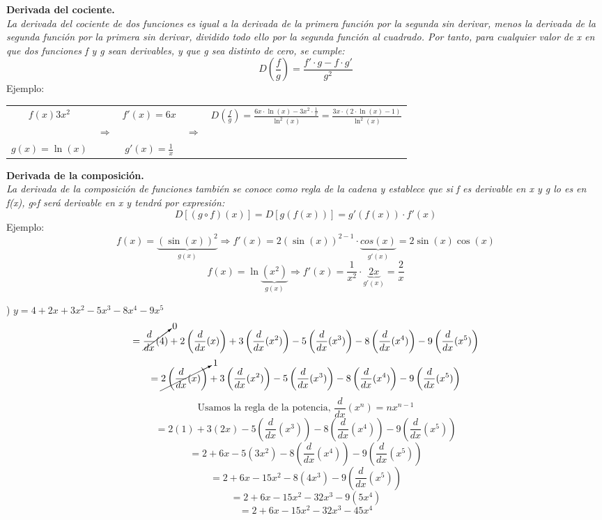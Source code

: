 \documentclass[11pt]{report}
\newcommand{\dx}{\frac{d}{dx}}
\begin{document}
\textbf{Derivada del cociente.}\\[2mm]
\textit{La derivada del cociente de dos funciones es igual a la derivada de la primera función por la segunda sin derivar, menos la derivada de la segunda función por la primera sin derivar, dividido todo ello por la segunda función al cuadrado. Por tanto, para cualquier valor de x en que dos funciones f y g sean derivables, y que g sea distinto de cero, se cumple:}
$$D\left(\frac{f}{g}\right)=\frac{f'\cdot g-f\cdot g'}{g^2}$$
Ejemplo:
\begin{center}
\begin{table}[h]
\begin{tabular}{ccccc}
$f(x)3x^2$ & &$f'(x)=6x$& & \multirow{3}{*}{$D\left(\frac{f}{g}\right)=\frac{6x\cdot \ln(x)-3x^2\cdot \frac{1}{x}}{\ln^2(x)}=\frac{3x\cdot (2\cdot \ln(x)-1)}{\ln^2(x)}$}\\
 &$\Longrightarrow$ & & $\Longrightarrow$ &  \\
$g(x)=\ln(x)$ & &$g'(x)=\frac{1}{x}$& & \\
\end{tabular}
\end{table}
\end{center}

\textbf{Derivada de la composición.}\\[2mm]
\textit{La derivada de la composición de funciones también se conoce como regla de la cadena y establece que si f es derivable en x y g lo es en f(x), g$\circ$f será derivable en x y tendrá por expresión:}
$$D[(g \circ f)(x)]=D[g(f(x))]=g'(f(x))\cdot f'(x)$$
Ejemplo:
$$f(x)=\underbrace{(\sin(x))^2}_{g(x)}\Longrightarrow f'(x)=2(\sin(x))^{2-1}\cdot \underbrace{cos(x)}_{g'(x)}=2\sin(x) \cos(x)$$
$$f(x)=\ln \underbrace{(x^2)}_{g(x)} \Longrightarrow f'(x)=\frac{1}{x^2}\cdot \underbrace{2x}_{g'(x)}=\frac{2}{x}$$

) $y=4+2x+3x^2-5x^3-8x^4-9x^5$
$$=\cancelto{0}{\dx (4)}+2\left(\dx (x)\right)+3\left(\dx (x^2)\right)-5\left(\dx (x^3)\right)-8\left(\dx (x^4)\right)-9\left(\dx (x^5)\right)$$
$$=\cancelto{1}{2\left(\dx (x)\right)}+3\left(\dx (x^2)\right)-5\left(\dx (x^3)\right)-8\left(\dx (x^4)\right)-9\left(\dx (x^5)\right)$$
$$\text{Usamos la regla de la potencia, }\dx (x^n)=n x^{n-1}$$ 
$$=2(1)+3(2x)-5\left(\dx (x^3)\right)-8\left(\dx (x^4)\right)-9\left(\dx (x^5)\right)$$
$$=2+6x-5(3x^2)-8\left(\dx (x^4)\right)-9\left(\dx (x^5)\right)$$
$$=2+6x-15x^2-8(4x^3)-9\left(\dx (x^5)\right)$$
$$=2+6x-15x^2-32x^3-9(5x^4)$$
$$=2+6x-15x^2-32x^3-45x^4$$
\end{document}
